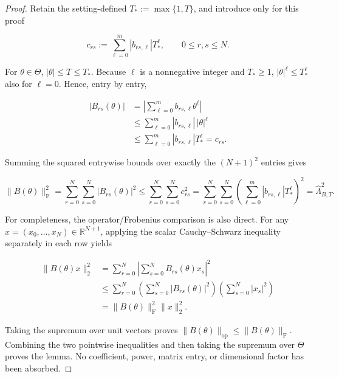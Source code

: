 \begin{proof}
Retain the setting-defined \(T_*:=\max\{1,T\}\), and introduce only for this proof

\begin{equation}
\label{eq:appendix-display-006}
c_{rs}:=\sum_{\ell=0}^{m}|b_{rs,\ell}|T_*^\ell,
\qquad 0\leq r,s\leq N.
\end{equation}

For \(\theta\in\Theta\), \(|\theta|\leq T\leq T_*\). Because \(\ell\) is a nonnegative integer and
\(T_*\geq1\), \(|\theta|^\ell\leq T_*^\ell\) also for \(\ell=0\). Hence, entry by entry,

\begin{equation}
\label{eq:appendix-display-007}
\begin{aligned}
|B_{rs}(\theta)|
&=\left|\sum_{\ell=0}^{m}b_{rs,\ell}\theta^\ell\right|\\
&\leq\sum_{\ell=0}^{m}|b_{rs,\ell}|\,|\theta|^\ell\\
&\leq\sum_{\ell=0}^{m}|b_{rs,\ell}|T_*^\ell
=c_{rs}.
\end{aligned}
\end{equation}

Summing the squared entrywise bounds over exactly the \((N+1)^2\) entries gives

\begin{equation}
\label{eq:appendix-display-008}
\|B(\theta)\|_{\mathrm F}^2
=\sum_{r=0}^{N}\sum_{s=0}^{N}|B_{rs}(\theta)|^2
\leq\sum_{r=0}^{N}\sum_{s=0}^{N}c_{rs}^2
=\sum_{r=0}^{N}\sum_{s=0}^{N}
\left(\sum_{\ell=0}^{m}|b_{rs,\ell}|T_*^\ell\right)^2
=\widehat\Lambda_{B,T}^2.
\end{equation}

For completeness, the operator/Frobenius comparison is also direct. For any
\(x=(x_0,\ldots,x_N)\in\mathbb R^{N+1}\), applying the scalar Cauchy--Schwarz inequality separately in each
row yields

\begin{equation}
\label{eq:appendix-display-009}
\begin{aligned}
\|B(\theta)x\|_2^2
&=\sum_{r=0}^{N}\left|\sum_{s=0}^{N}B_{rs}(\theta)x_s\right|^2\\
&\leq\sum_{r=0}^{N}
\left(\sum_{s=0}^{N}|B_{rs}(\theta)|^2\right)
\left(\sum_{s=0}^{N}|x_s|^2\right)\\
&=\|B(\theta)\|_{\mathrm F}^2\|x\|_2^2.
\end{aligned}
\end{equation}

Taking the supremum over unit vectors proves
\(\|B(\theta)\|_{\mathrm{op}}\leq\|B(\theta)\|_{\mathrm F}\). Combining the two pointwise inequalities and
then taking the supremum over \(\Theta\) proves the lemma. No coefficient, power, matrix entry, or dimensional
factor has been absorbed. 
\end{proof}

